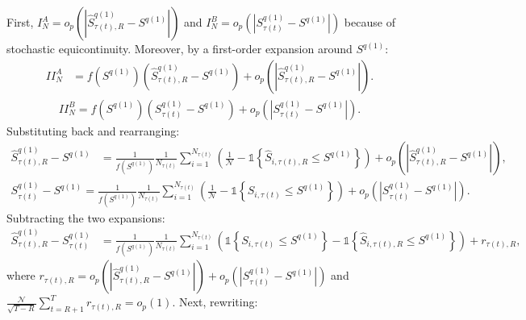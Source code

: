 First, $I_N^A = o_p\!\left( \left|\widehat{S}_{\tau(t),R}^{q(1)}-S^{q(1)}\right|\right)$ and $I_N^B=o_p\!\left( \left|S_{\tau(t)}^{q(1)}-S^{q(1)}\right|\right)$ because of stochastic equicontinuity. Moreover, by a first-order expansion around $S^{q(1)}$:
\begin{align*}
II_N^A &= f\left( S^{q(1)}\right)\left( \widehat{S}_{\tau(t),R}^{q(1)}-S^{q(1)}\right) +o_p\!\left( \left|\widehat{S}_{\tau(t),R}^{q(1)}-S^{q(1)}\right|\right).
\end{align*}
\begin{align*}
II_N^B =f\left( S^{q(1)}\right)\left( S_{\tau(t)}^{q(1)}-S^{q(1)}\right) +o_p\!\left( \left|S_{\tau(t)}^{q(1)}-S^{q(1)}\right|\right).
\end{align*}
Substituting back and rearranging:
\begin{align*}
\widehat{S}_{\tau(t),R}^{q(1)}-S^{q(1)} &=\frac{1}{f\left( S^{q(1)}\right)}\frac{1}{N_{\tau(t)}}\sum_{i=1}^{N_{\tau(t)}}\left( \frac{1}{\mathcal{N}}-\mathds{1}\left\{ \widehat{S}_{i,\tau(t),R}\leq S^{q(1)}\right\} \right) +o_p\!\left( \left|\widehat{S}_{\tau(t),R}^{q(1)}-S^{q(1)}\right|\right),
\end{align*}
\begin{align*}
S_{\tau(t)}^{q(1)}-S^{q(1)} =\frac{1}{f\left( S^{q(1)}\right)}\frac{1}{N_{\tau(t)}}\sum_{i=1}^{N_{\tau(t)}}\left( \frac{1}{\mathcal{N}}-\mathds{1}\left\{ S_{i,\tau(t)}\leq S^{q(1)}\right\} \right)
+o_p\!\left( \left|S_{\tau(t)}^{q(1)}-S^{q(1)}\right|\right).
\end{align*}
Subtracting the two expansions:
\begin{align*}
\widehat{S}_{\tau(t),R}^{q(1)}-S_{\tau(t)}^{q(1)}
&=\frac{1}{f\left( S^{q(1)}\right)}\frac{1}{N_{\tau(t)}}\sum_{i=1}^{N_{\tau(t)}}\left( \mathds{1}\left\{ S_{i,\tau(t)}\leq S^{q(1)}\right\}-\mathds{1}\left\{ \widehat{S}_{i,\tau(t),R}\leq S^{q(1)}\right\} \right)
+r_{\tau(t),R},
\end{align*}
where $r_{\tau(t),R}
=o_p\!\left( \left|\widehat{S}_{\tau(t),R}^{q(1)}-S^{q(1)}\right|\right)
+o_p\!\left( \left|S_{\tau(t)}^{q(1)}-S^{q(1)}\right|\right)$ and $\frac{\mathcal{N}}{\sqrt{T-R}}\sum_{t=R+1}^{T}r_{\tau(t),R}=o_p(1)$. Next, rewriting:
